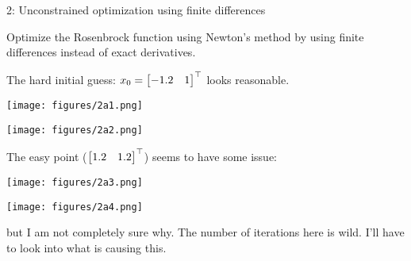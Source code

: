 
\begin{problem}{2: Unconstrained optimization using finite differences}

  Optimize the Rosenbrock function using Newton's method by using finite differences instead of exact derivatives. 

\end{problem}


The hard initial guess: $x_0 = \begin{bmatrix} -1.2 & 1 \end{bmatrix}^{\top}$ looks reasonable. 

\begin{minipage}[c]{0.5\textwidth}
  \centering
  \texttt{[image: figures/2a1.png]}
\end{minipage}
\hfill
\begin{minipage}[c]{0.5\textwidth}
  \centering
  \texttt{[image: figures/2a2.png]}
\end{minipage}

The easy point ($\begin{bmatrix} 1.2 & 1.2 \end{bmatrix}^{\top}$) seems to have some issue: 

\begin{minipage}[c]{0.5\textwidth}
  \centering
  \texttt{[image: figures/2a3.png]}
\end{minipage}
\hfill
\begin{minipage}[c]{0.5\textwidth}
  \centering
  \texttt{[image: figures/2a4.png]}
\end{minipage}

but I am not completely sure why. The number of iterations here is wild. I'll have to look into 
what is causing this. 